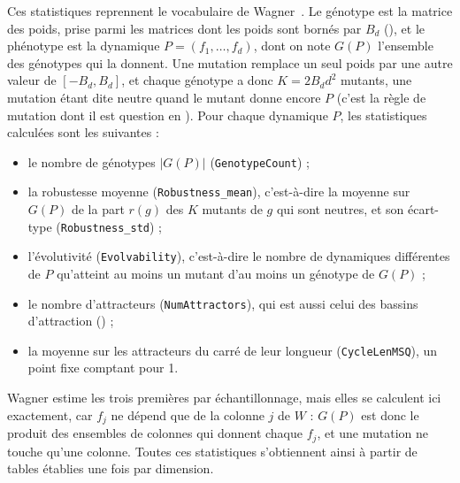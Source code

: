 \documentclass[12pt, a4paper]{article}
\begin{document}
Ces statistiques reprennent le vocabulaire de Wagner~\cite{wagner2008}.
Le génotype est la matrice des poids, prise parmi les matrices dont les poids sont bornés par $B_d$ (), et le phénotype est la dynamique $P = (f_1, \dots, f_d)$, dont on note $G(P)$ l'ensemble des génotypes qui la donnent.
Une mutation remplace un seul poids par une autre valeur de $[-B_d, B_d]$, et chaque génotype a donc $K = 2B_d d^2$ mutants, une mutation étant dite neutre quand le mutant donne encore $P$ (c'est la règle de mutation dont il est question en ).
Pour chaque dynamique $P$, les statistiques calculées sont les suivantes :
\begin{itemize}
\item le nombre de génotypes $|G(P)|$ (\texttt{GenotypeCount}) ;
\item la robustesse moyenne (\texttt{Robustness\_mean}), c'est-à-dire la moyenne sur $G(P)$ de la part $r(g)$ des $K$ mutants de $g$ qui sont neutres, et son écart-type (\texttt{Robustness\_std}) ;
\item l'évolutivité (\texttt{Evolvability}), c'est-à-dire le nombre de dynamiques différentes de $P$ qu'atteint au moins un mutant d'au moins un génotype de $G(P)$ ;
\item le nombre d'attracteurs (\texttt{NumAttractors}), qui est aussi celui des bassins d'attraction () ;
\item la moyenne sur les attracteurs du carré de leur longueur (\texttt{CycleLenMSQ}), un point fixe comptant pour 1.
\end{itemize}
Wagner estime les trois premières par échantillonnage, mais elles se calculent ici exactement, car $f_j$ ne dépend que de la colonne $j$ de $W$ : $G(P)$ est donc le produit des ensembles de colonnes qui donnent chaque $f_j$, et une mutation ne touche qu'une colonne.
Toutes ces statistiques s'obtiennent ainsi à partir de tables établies une fois par dimension.
\end{document}
